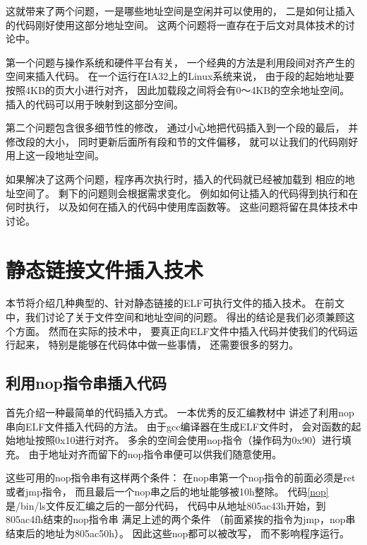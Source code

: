 这就带来了两个问题，一是哪些地址空间是空闲并可以使用的，
二是如何让插入的代码刚好使用这部分地址空间。
这两个问题将一直存在于后文对具体技术的讨论中。

第一个问题与操作系统和硬件平台有关，
一个经典的方法是利用段间对齐产生的空间来插入代码。
在一个运行在IA32上的Linux系统来说，
由于段的起始地址要按照4KB的页大小进行对齐，
因此加载段之间将会有0～4KB的空余地址空间。
插入的代码可以用于映射到这部分空间。

第二个问题包含很多细节性的修改，
通过小心地把代码插入到一个段的最后，
并修改段的大小，
同时更新后面所有段和节的文件偏移，
就可以让我们的代码刚好用上这一段地址空间。

如果解决了这两个问题，程序再次执行时，插入的代码就已经被加载到
相应的地址空间了。
剩下的问题则会根据需求变化。
例如如何让插入的代码得到执行和在何时执行，
以及如何在插入的代码中使用库函数等。
这些问题将留在具体技术中讨论。

\section{静态链接文件插入技术}

本节将介绍几种典型的、针对静态链接的ELF可执行文件的插入技术。
在前文中，我们讨论了关于文件空间和地址空间的问题。
得出的结论是我们必须兼顾这个方面。
然而在实际的技术中，
要真正向ELF文件中插入代码并使我们的代码运行起来，
特别是能够在代码体中做一些事情，
还需要很多的努力。

\subsection{利用nop指令串插入代码}

首先介绍一种最简单的代码插入方式。
一本优秀的反汇编教材\cite{heike}中
讲述了利用nop串向ELF文件插入代码的方法。
由于gcc编译器在生成ELF文件时，
会对函数的起始地址按照0x10进行对齐。
多余的空间会使用nop指令（操作码为0x90）进行填充。
由于地址对齐而留下的nop指令串便可以供我们随意使用。

这些可用的nop指令串有这样两个条件：
在nop串第一个nop指令的前面必须是ret或者jmp指令，
而且最后一个nop串之后的地址能够被10h整除。
代码\ref{nop}是/bin/ls文件反汇编之后的一部分代码，
代码中从地址805ac43h开始，到805ac4fh结束的nop指令串
满足上述的两个条件
（前面紧挨的指令为jmp，nop串结束后的地址为805ac50h）。
因此这些nop都可以被改写，
而不影响程序运行。

